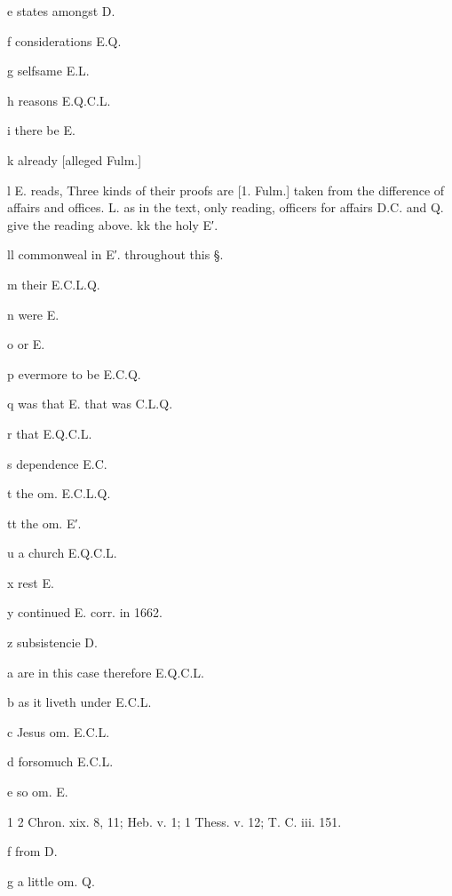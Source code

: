 e
states amongst D.

f
considerations E.Q.

g
selfsame E.L.

h
reasons E.Q.C.L.

i
there be E.

k
already [alleged Fulm.]

l E. reads, Three kinds of their proofs are [1. Fulm.] taken from the difference of affairs and offices. L. as in the text, only reading, officers for affairs D.C. and Q. give the reading above.
kk
the holy E′.

ll
commonweal in E′. throughout this §.

m
their E.C.L.Q.

n
were E.

o
or E.

p
evermore to be E.C.Q.

q
was that E. that was C.L.Q.

r
that E.Q.C.L.

s
dependence E.C.

t
the om. E.C.L.Q.

tt
the om. E′.

u
a church E.Q.C.L.

x
rest E.

y
continued E. corr. in 1662.

z
subsistencie D.

a
are in this case therefore E.Q.C.L.

b
as it liveth under E.C.L.

c
Jesus om. E.C.L.

d
forsomuch E.C.L.

e
so om. E.

1
2 Chron. xix. 8, 11; Heb. v. 1; 1 Thess. v. 12; T. C. iii. 151.

f
from D.

g
a little om. Q.

